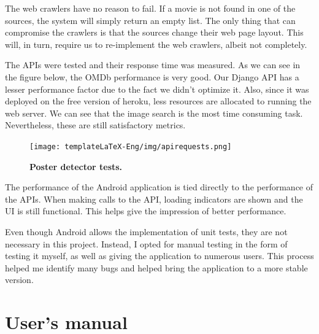 \documentclass[12pt,a4paper,twoside]{report}
\begin{document}
The web crawlers have no reason to fail. If a movie is not found in one of the sources, the system will simply return an empty list. The only thing that can compromise the crawlers is that the sources change their web page layout. This will, in turn, require us to re-implement the web crawlers, albeit not completely.

The APIs were tested and their response time was measured. As we can see in the figure below, the OMDb performance is very good. Our Django API has a lesser performance factor due to the fact we didn't optimize it. Also, since it was deployed on the free version of heroku, less resources are allocated to running the web server. We can see that the image search is the most time consuming task. Nevertheless, these are still satisfactory metrics.

 \begin{figure}[H]
    \begin{center}
        \texttt{[image: templateLaTeX-Eng/img/apirequests.png]}
        \caption{\bf Poster detector tests.}
    \end{center}
\end{figure}

The performance of the Android application is tied directly to the performance of the APIs. When making calls to the API, loading indicators are shown and the UI is still functional. This helps give the impression of better performance.

Even though Android allows the implementation of unit tests, they are not necessary in this project. Instead, I opted for manual testing in the form of testing it myself, as well as giving the application to numerous users. This process helped me identify many bugs and helped bring the application to a more stable version.

\chapter{User's manual}
\end{document}
